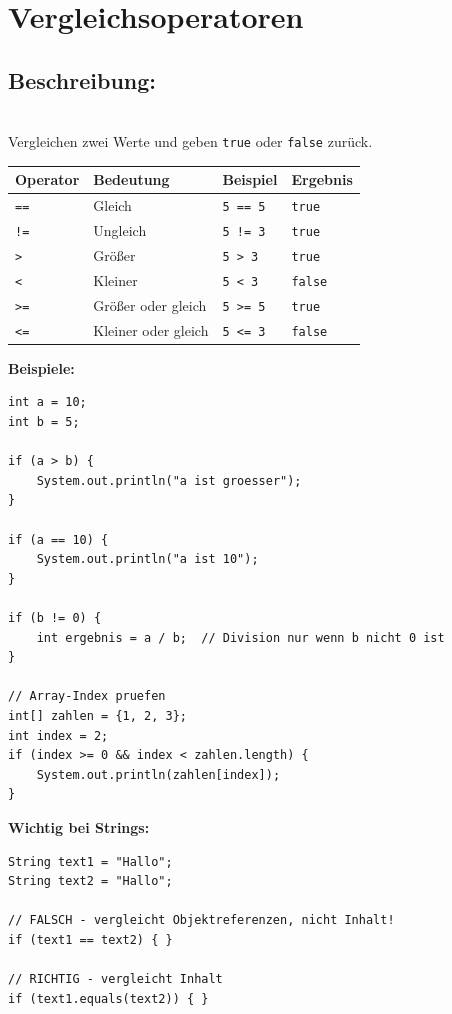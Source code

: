 \newpage


\section*{Vergleichsoperatoren}

\subsection*{Beschreibung:}\\
Vergleichen zwei Werte und geben \texttt{true} oder \texttt{false} zurück.

\begin{center}
\begin{tabular}{|l|l|l|l|}
\hline
\textbf{Operator} & \textbf{Bedeutung} & \textbf{Beispiel} & \textbf{Ergebnis} \\
\hline
\texttt{==} & Gleich & \texttt{5 == 5} & \texttt{true} \\
\hline
\texttt{!=} & Ungleich & \texttt{5 != 3} & \texttt{true} \\
\hline
\texttt{>} & Größer & \texttt{5 > 3} & \texttt{true} \\
\hline
\texttt{<} & Kleiner & \texttt{5 < 3} & \texttt{false} \\
\hline
\texttt{>=} & Größer oder gleich & \texttt{5 >= 5} & \texttt{true} \\
\hline
\texttt{<=} & Kleiner oder gleich & \texttt{5 <= 3} & \texttt{false} \\
\hline
\end{tabular}
\end{center}

\textbf{Beispiele:}
\begin{lstlisting}
int a = 10;
int b = 5;

if (a > b) {
    System.out.println("a ist groesser");
}

if (a == 10) {
    System.out.println("a ist 10");
}

if (b != 0) {
    int ergebnis = a / b;  // Division nur wenn b nicht 0 ist
}

// Array-Index pruefen
int[] zahlen = {1, 2, 3};
int index = 2;
if (index >= 0 && index < zahlen.length) {
    System.out.println(zahlen[index]);
}
\end{lstlisting}

\textbf{Wichtig bei Strings:}
\begin{lstlisting}
String text1 = "Hallo";
String text2 = "Hallo";

// FALSCH - vergleicht Objektreferenzen, nicht Inhalt!
if (text1 == text2) { }

// RICHTIG - vergleicht Inhalt
if (text1.equals(text2)) { }
\end{lstlisting}

